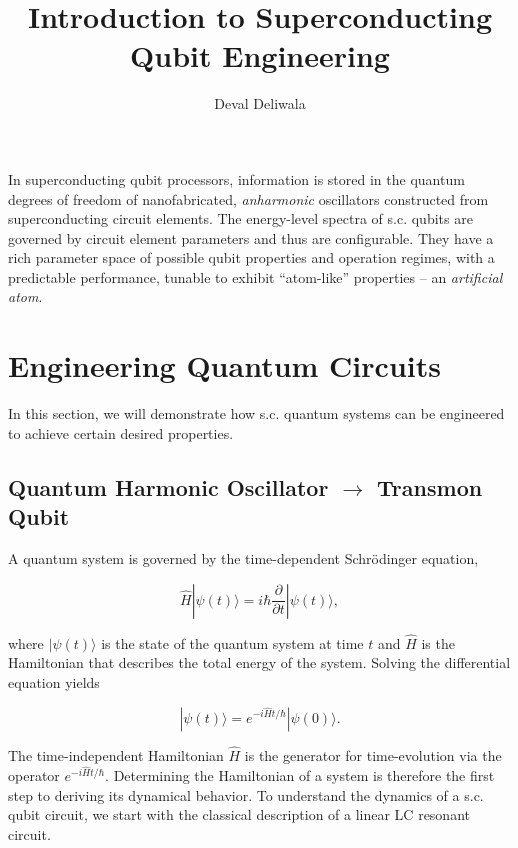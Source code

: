 \documentclass[svgnames]{article}     %
\title{Introduction to Superconducting Qubit Engineering}
\author{Deval Deliwala}
\begin{document}
\maketitle

In superconducting qubit processors, information is stored in the quantum
degrees of freedom of nanofabricated, \textit{anharmonic} oscillators
constructed from superconducting circuit elements. The energy-level spectra of
s.c. qubits are governed by circuit element parameters and thus are
configurable. They have a rich parameter space of possible qubit properties and
operation regimes, with a predictable performance, tunable to exhibit
``atom-like'' properties -- an \textit{artificial atom}. 

\section{Engineering Quantum Circuits}

In this section, we will demonstrate how s.c. quantum systems can be engineered
to achieve certain desired properties.  

\subsection{Quantum Harmonic Oscillator $\rightarrow$ Transmon Qubit}

A quantum system is governed by the time-dependent Schr\"odinger equation, 

\[
  \hat{H}|\psi(t)\rangle = i\hbar \frac{\partial }{\partial t} |\psi(t)\rangle,
\] \vspace{3px}

where $|\psi(t)\rangle$ is the state of the quantum system at time $t$ and
$\hat{H}$ is the Hamiltonian that describes the total energy of the system.
Solving the differential equation yields 

\[
  |\psi(t)\rangle = e^{-i\hat{H} t / \hbar} |\psi(0)\rangle. 
\] \vspace{3px}

The time-independent Hamiltonian $\hat{H}$ is the generator for time-evolution
via the operator $e^{-i \hat{H} t / \hbar}$. Determining the Hamiltonian of
a system is therefore the first step to deriving its dynamical behavior. To understand the dynamics of a s.c. qubit circuit, we start with the classical
description of a linear LC resonant circuit. 
\end{document}
